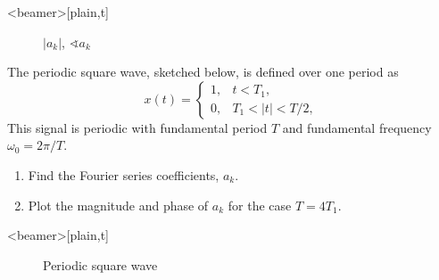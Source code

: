 \begin{frame}<beamer>[plain,t]
    \begin{figure}
      \centering
      
      \caption{$|a_k|$, $\sphericalangle a_k$}\label{fi:secb-example01_fourier_euler}
    \end{figure}
\end{frame}



\begin{frame}
    \begin{example}
        The periodic square wave, sketched below, is defined over one period as
        \begin{equation*}
            x(t) = \begin{cases}
                1, & {t}<T_1,\\
                0, & T_1 < |t| < T/2,
            \end{cases}
        \end{equation*}
        This signal is periodic with fundamental period $T$ and fundamental frequency $\omega_0 = 2\pi/T$.
        \begin{enumerate}
            \item Find the Fourier series coefficients, $a_k$.
            \item Plot the magnitude and phase of $a_k$ for the case $T=4T_1$.
        \end{enumerate}
    \end{example}
\end{frame}

\begin{frame}<beamer>[plain,t]
    \begin{figure}
      \centering
      
      \caption{Periodic square wave}\label{fi:example02_periodic_square_wave }
    \end{figure}
\end{frame}

